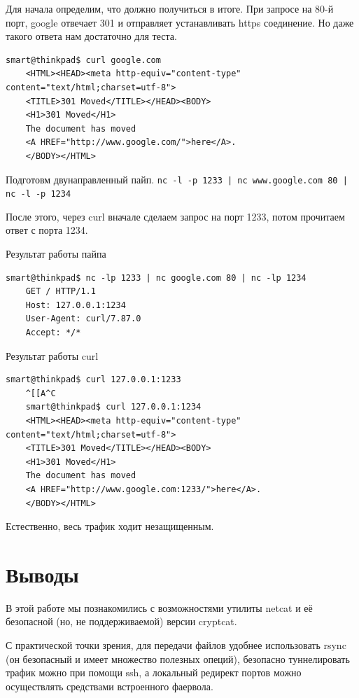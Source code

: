Для начала определим, что должно получиться в итоге. При запросе на 80-й порт, google отвечает 301 и отправляет устанавливать https соединение. Но даже такого ответа нам достаточно для теста.

\begin{Verbatim}[frame=single]
    smart@thinkpad$ curl google.com
    <HTML><HEAD><meta http-equiv="content-type" content="text/html;charset=utf-8">
    <TITLE>301 Moved</TITLE></HEAD><BODY>
    <H1>301 Moved</H1>
    The document has moved
    <A HREF="http://www.google.com/">here</A>.
    </BODY></HTML>
\end{Verbatim}

Подготовм двунаправленный пайп.
\texttt{nc -l -p 1233 | nc www.google.com 80 | nc -l -p 1234}

После этого, через curl вначале сделаем запрос на порт 1233, потом прочитаем ответ с порта 1234.

Результат работы пайпа
\begin{Verbatim}[frame=single]
    smart@thinkpad$ nc -lp 1233 | nc google.com 80 | nc -lp 1234
    GET / HTTP/1.1
    Host: 127.0.0.1:1234
    User-Agent: curl/7.87.0
    Accept: */*
\end{Verbatim}

Результат работы curl
\begin{Verbatim}[frame=single]
    smart@thinkpad$ curl 127.0.0.1:1233
    ^[[A^C
    smart@thinkpad$ curl 127.0.0.1:1234
    <HTML><HEAD><meta http-equiv="content-type" content="text/html;charset=utf-8">
    <TITLE>301 Moved</TITLE></HEAD><BODY>
    <H1>301 Moved</H1>
    The document has moved
    <A HREF="http://www.google.com:1233/">here</A>.
    </BODY></HTML>
\end{Verbatim}

Естественно, весь трафик ходит незащищенным.

\section*{Выводы}

В этой работе мы познакомились с возможностями утилиты netcat и её безопасной (но, не поддерживаемой) версии cryptcat.

С практической точки зрения, для передачи файлов удобнее использовать rsync (он безопасный и имеет множество полезных опеций), безопасно туннелировать трафик можно при помощи ssh, а локальный редирект портов можно осуществлять средствами встроенного фаервола.